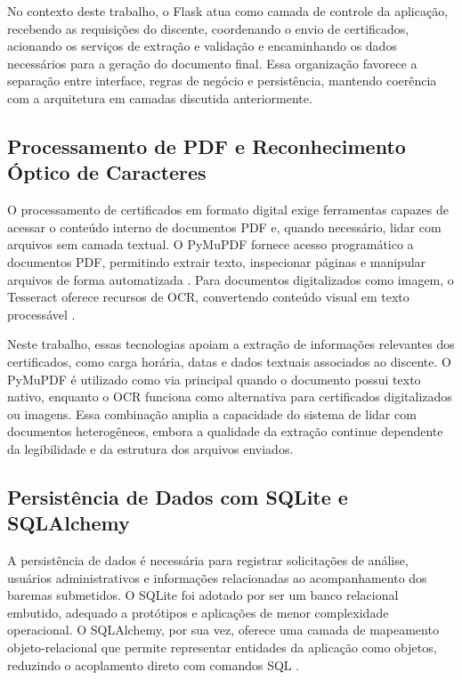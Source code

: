 No contexto deste trabalho, o Flask atua como camada de controle da aplicação, recebendo as requisições do discente, coordenando o envio de certificados, acionando os serviços de extração e validação e encaminhando os dados necessários para a geração do documento final. Essa organização favorece a separação entre interface, regras de negócio e persistência, mantendo coerência com a arquitetura em camadas discutida anteriormente.

\subsection{Processamento de PDF e Reconhecimento Óptico de Caracteres}

O processamento de certificados em formato digital exige ferramentas capazes de acessar o conteúdo interno de documentos PDF e, quando necessário, lidar com arquivos sem camada textual. O PyMuPDF fornece acesso programático a documentos PDF, permitindo extrair texto, inspecionar páginas e manipular arquivos de forma automatizada \cite{pymupdf2026}. Para documentos digitalizados como imagem, o Tesseract oferece recursos de OCR, convertendo conteúdo visual em texto processável \cite{tesseract}.

Neste trabalho, essas tecnologias apoiam a extração de informações relevantes dos certificados, como carga horária, datas e dados textuais associados ao discente. O PyMuPDF é utilizado como via principal quando o documento possui texto nativo, enquanto o OCR funciona como alternativa para certificados digitalizados ou imagens. Essa combinação amplia a capacidade do sistema de lidar com documentos heterogêneos, embora a qualidade da extração continue dependente da legibilidade e da estrutura dos arquivos enviados.

\subsection{Persistência de Dados com SQLite e SQLAlchemy}

A persistência de dados é necessária para registrar solicitações de análise, usuários administrativos e informações relacionadas ao acompanhamento dos baremas submetidos. O SQLite foi adotado por ser um banco relacional embutido, adequado a protótipos e aplicações de menor complexidade operacional. O SQLAlchemy, por sua vez, oferece uma camada de mapeamento objeto-relacional que permite representar entidades da aplicação como objetos, reduzindo o acoplamento direto com comandos SQL \cite{sqlalchemy}.

